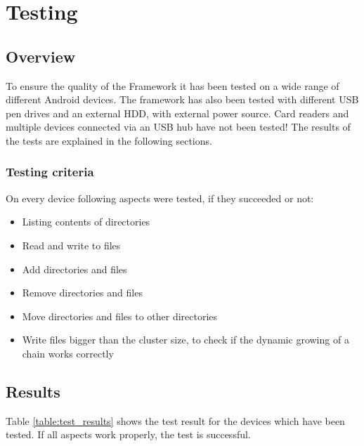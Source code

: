 \chapter{Testing}

\section{Overview}

To ensure the quality of the Framework it has been tested on a wide range of different Android devices. The framework has also been tested with different USB pen drives and an external HDD, with external power source. Card readers and multiple devices connected via an USB hub have not been tested! The results of the tests are explained in the following sections.

\subsection{Testing criteria}

On every device following aspects were tested, if they succeeded or not:

\begin{itemize}
\item Listing contents of directories
\item Read and write to files
\item Add directories and files
\item Remove directories and files
\item Move directories and files to other directories
\item Write files bigger than the cluster size, to check if the dynamic growing of a chain works correctly
\end{itemize}

\section{Results}

Table \ref{table:test_results} shows the test result for the devices which have been tested. If all aspects work properly, the test is successful.

